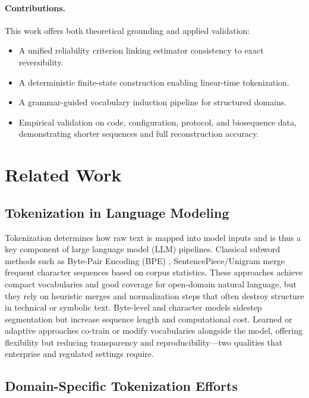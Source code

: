 \paragraph{Contributions.}
This work offers both theoretical grounding and applied validation:
\begin{itemize}
    \item A unified reliability criterion linking estimator consistency to exact reversibility.
    \item A deterministic finite-state construction enabling linear-time tokenization.
    \item A grammar-guided vocabulary induction pipeline for structured domains.
    \item Empirical validation on code, configuration, protocol, and biosequence data, demonstrating shorter sequences and full reconstruction accuracy.
\end{itemize}

\section{Related Work}
\label{sec:related}

\subsection{Tokenization in Language Modeling}

Tokenization determines how raw text is mapped into model inputs and is thus a key component of large language model (LLM) pipelines.
Classical subword methods such as Byte-Pair Encoding (BPE) \citep{Sennrich2016BPE}, SentencePiece/Unigram \citep{KudoRichardson2018SentencePiece, Kudo2018Unigram} merge frequent character sequences based on corpus statistics.
These approaches achieve compact vocabularies and good coverage for open-domain natural language, but they rely on heuristic merges and normalization steps that often destroy structure in technical or symbolic text.
Byte-level and character models \citep{Xue2022ByT5, Ding2023ByteLevelTradeoff} sidestep segmentation but increase sequence length and computational cost.
Learned or adaptive approaches \citep{Wei2024VocabCompression} co-train or modify vocabularies alongside the model, offering flexibility but reducing transparency and reproducibility—two qualities that enterprise and regulated settings require.

\subsection{Domain-Specific Tokenization Efforts}

